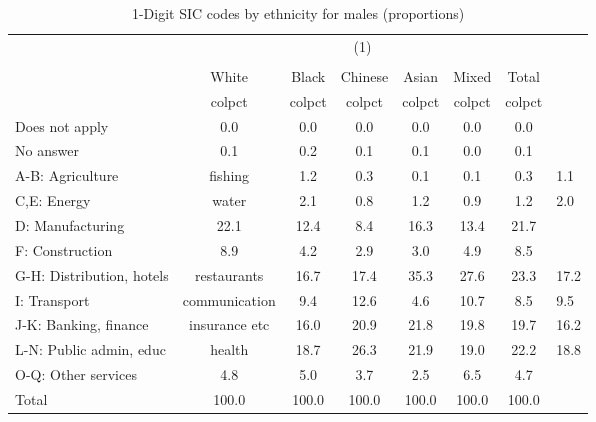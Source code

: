 \begin{table}[htbp]\centering
\def\sym#1{\ifmmode^{#1}\else\(^{#1}\)\fi}
\caption{1-Digit SIC codes by ethnicity for males (proportions)}
\begin{tabular}{l*{6}{c}}
\hline\hline
          &                                    \\
          &                                       \\
          &    White&    Black&  Chinese&    Asian&    Mixed&    Total\\
          &   colpct&   colpct&   colpct&   colpct&   colpct&   colpct\\
\hline
Does not apply&      0.0&      0.0&      0.0&      0.0&      0.0&      0.0\\
No answer &      0.1&      0.2&      0.1&      0.1&      0.0&      0.1\\
A-B: Agriculture & fishing&      1.2&      0.3&      0.1&      0.1&      0.3&      1.1\\
C,E: Energy & water&      2.1&      0.8&      1.2&      0.9&      1.2&      2.0\\
D: Manufacturing&     22.1&     12.4&      8.4&     16.3&     13.4&     21.7\\
F: Construction&      8.9&      4.2&      2.9&      3.0&      4.9&      8.5\\
G-H: Distribution, hotels & restaurants&     16.7&     17.4&     35.3&     27.6&     23.3&     17.2\\
I: Transport & communication&      9.4&     12.6&      4.6&     10.7&      8.5&      9.5\\
J-K: Banking, finance & insurance etc&     16.0&     20.9&     21.8&     19.8&     19.7&     16.2\\
L-N: Public admin, educ & health&     18.7&     26.3&     21.9&     19.0&     22.2&     18.8\\
O-Q: Other services&      4.8&      5.0&      3.7&      2.5&      6.5&      4.7\\
Total     &    100.0&    100.0&    100.0&    100.0&    100.0&    100.0\\
\hline\hline
\end{tabular}
\label{tab:1D_industries_male}
\end{table}
